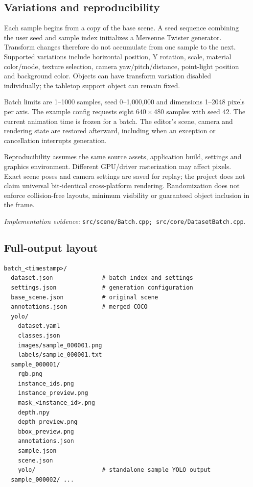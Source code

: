 \documentclass[12pt,a4paper]{article}
\newcommand{\code}[1]{{\small\nolinkurl{#1}}}
\newcommand{\source}[1]{\par{\raggedright\footnotesize\textit{Implementation evidence:} \code{#1}.\par}}
\begin{document}
\subsection{Variations and reproducibility}
Each sample begins from a copy of the base scene. A seed sequence combining the user seed and sample index initializes a Mersenne Twister generator. Transform changes therefore do not accumulate from one sample to the next. Supported variations include horizontal position, Y rotation, scale, material color/mode, texture selection, camera yaw/pitch/distance, point-light position and background color. Objects can have transform variation disabled individually; the tabletop support object can remain fixed.

Batch limits are 1--1000 samples, seed 0--1,000,000 and dimensions 1--2048 pixels per axis. The example config requests eight $640\times480$ samples with seed 42. The current animation time is frozen for a batch. The editor's scene, camera and rendering state are restored afterward, including when an exception or cancellation interrupts generation.

Reproducibility assumes the same source assets, application build, settings and graphics environment. Different GPU/driver rasterization may affect pixels. Exact scene poses and camera settings are saved for replay; the project does not claim universal bit-identical cross-platform rendering. Randomization does not enforce collision-free layouts, minimum visibility or guaranteed object inclusion in the frame.
\source{src/scene/Batch.cpp; src/core/DatasetBatch.cpp}

\subsection{Full-output layout}
\begin{lstlisting}
batch_<timestamp>/
  dataset.json              # batch index and settings
  settings.json             # generation configuration
  base_scene.json           # original scene
  annotations.json          # merged COCO
  yolo/
    dataset.yaml
    classes.json
    images/sample_000001.png
    labels/sample_000001.txt
  sample_000001/
    rgb.png
    instance_ids.png
    instance_preview.png
    mask_<instance_id>.png
    depth.npy
    depth_preview.png
    bbox_preview.png
    annotations.json
    sample.json
    scene.json
    yolo/                   # standalone sample YOLO output
  sample_000002/ ...
\end{lstlisting}
\end{document}
